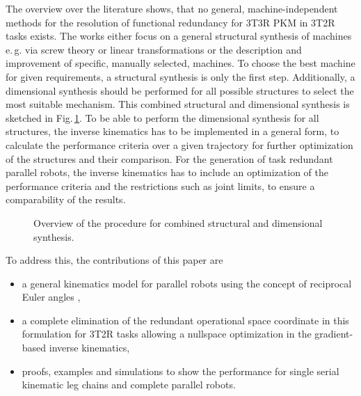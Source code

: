 \documentclass[robotics,article,submit,moreauthors,pdftex]{Definitions/mdpi}
\begin{document}
The overview over the literature shows, that no general, machine-independent methods for the resolution of functional redundancy for 3T3R PKM in 3T2R tasks exists.
The works either focus on a general structural synthesis of machines e.\,g. via screw theory \cite{KongGos2005} or linear transformations \cite{Gogu2006} or the description and improvement of specific, manually selected, machines.
To choose the best machine for given requirements, a structural synthesis is only the first step.
Additionally, a dimensional synthesis should be performed for all possible structures to select the most suitable mechanism.
This combined structural and dimensional synthesis \cite{RamirezKotOrt2015} is sketched in Fig.\,\ref{fig:structdimsynth}.
To be able to perform the dimensional synthesis for all structures, the inverse kinematics has to be implemented in a general form, to calculate the performance criteria over a given trajectory for further optimization of the structures and their comparison.
For the generation of task redundant parallel robots, the inverse kinematics has to include an optimization of the performance criteria and the restrictions such as joint limits, to ensure a comparability of the results.
%
\begin{figure}[tb]
	
	\caption{Overview of the procedure for combined structural and dimensional synthesis.}
	\label{fig:structdimsynth}
\end{figure} 
%
%
To address this, the contributions of this paper are
\begin{itemize}
\item a general kinematics model for parallel robots using the concept of reciprocal Euler angles \cite{1_SchapplerTapOrt2019},
\item a complete elimination of the redundant operational space coordinate in this formulation for 3T2R tasks allowing a nullspace optimization in the gradient-based inverse kinematics,
\item proofs, examples and simulations to show the performance for single serial kinematic leg chains and complete parallel robots.
\end{itemize}
\end{document}
